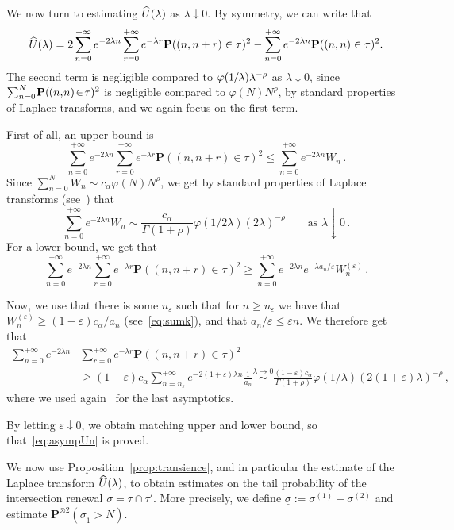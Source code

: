 \documentclass[AHL,Unicode,longabstracts]{cedram}
\newcommand{\ga}{\alpha}
\newcommand{\gep}{\varepsilon}
\newcommand{\gl}{\lambda}
\let\oldhat\hat
\renewcommand*{\hat}[1]{\mathchoice{\widehat{#1}}{\widehat{#1}}{\oldhat{#1}}{\oldhat{#1}}}
\newcommand{\bP}{\ensuremath{\mathbf{P}}}
\newcommand*{\mk}{\mkern -1mu}
\newcommand*{\Mk}{\mkern -2mu}
\begin{document}
\begin{appendix}
\begin{proofc}
We now turn to estimating $\hat U (\gl)$ as $\gl \downarrow 0$. By symmetry, we can write that
\[
\hat U(\gl) = 2\sum_{n=0}^{+\infty} e^{-2 \gl n}\sum_{r=0}^{+\infty} e^{-\gl r} \bP((n,n+r)\in\tau)^2 - \sum_{n=0}^{+\infty} e^{-2\gl n} \bP((n,n)\in\tau)^2.
\]
The second term is negligible compared to $ \varphi(1\mk/\mk\gl) \gl^{-\rho}$ as $\gl \!\downarrow\! 0$, since $\sum_{n=0}^N\Mk \bP(\mk{(n,\Mk n)\!\in\!\tau})^2$ is negligible compared to $ \varphi(N)N^{\rho}$, by standard properties of Laplace transforms, and we again focus on the first term.

First of all, an upper bound is
\[
\sum_{n=0}^{+\infty} e^{-2 \gl n}\sum_{r=0}^{+\infty} e^{-\gl r} \bP((n,n+r)\in\tau)^2 \leq \sum_{n=0}^{+\infty} e^{-2\gl n} W_n\,.
\]
Since $\sum_{n=0}^{N} W_n \sim c_{\ga} \varphi(N)N^{\rho}$, we get by standard properties of Laplace transforms (see~\cite[Corollary~1.7.3]{cf:BGT}) that
\[
\sum_{n=0}^{+\infty} e^{-2\gl n} W_n \sim \frac{c_\ga}{\Gamma(1+\rho)} \varphi(1/2\gl) (2\gl)^{-\rho} \qquad \text{as } \gl \downarrow 0\,.
\]
For a lower bound, we get that
\[
\sum_{n=0}^{+\infty} e^{-2 \gl n}\sum_{r=0}^{+\infty} e^{-\gl r} \bP((n,n+r)\in\tau)^2 \geq \sum_{n=0}^{+\infty} e^{-2\gl n} e^{-\gl a_n /\gep} W_n^{(\gep)}\,.
\]

Now, we use that there is some $n_{\gep}$ such that for $n\geq n_{\gep}$ we have that $W_n^{(\gep)}\geq (1-\gep) c_{\ga} /a_n$ (see~\eqref{eq:sumk}), and that $a_n/\gep \leq \gep n$. We therefore get that
\begin{align*}
\sum_{n=0}^{+\infty} e^{-2 \gl n}&\sum_{r=0}^{+\infty} e^{-\gl r} \bP((n,n+r)\in\tau)^2 \\
& \geq (1-\gep) c_\ga \sum_{n=n_{\gep}}^{+\infty} e^{-2(1+\gep)\gl n} \frac{1}{a_n} \stackrel{\gl\to 0}{\sim} \frac{(1-\gep) c_\ga}{\Gamma(1+\rho)} \varphi(1/\gl) (2(1+\gep) \gl)^{-\rho}\,,
\end{align*}
where we used again~\cite[Corollary~1.7.3]{cf:BGT} for the last asymptotics.

By letting $\gep \downarrow 0$, we obtain matching upper and lower bound, so that~\eqref{eq:asympUn} is proved.
\end{proofc}

We now use Proposition~\ref{prop:transience}, and in particular the estimate of the Laplace transform $\hat U(\gl)$, to obtain estimates on the tail probability of the intersection renewal $\sigma=\tau\cap \tau'$. More precisely, we define $\underline{\sigma}:= \sigma^{(1)} + \sigma^{(2)}$ and estimate $\bP^{\otimes 2}(\underline \sigma _1 >N)$.


\end{appendix}
\end{document}
